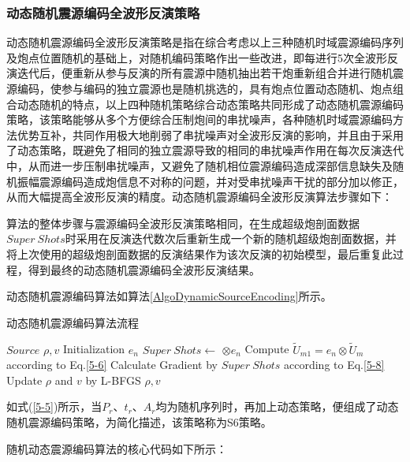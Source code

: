 \documentclass[12pt]{article}
\renewcommand{\algorithmicrequire}{\textbf{参数说明:}}
\renewcommand{\algorithmicensure}{\textbf{输出:}}
\newcommand{\upcite}[1]{\textsuperscript{\textsuperscript{\cite{#1}}}}
\begin{document}
\subsubsection{动态随机震源编码全波形反演策略}
动态随机震源编码全波形反演策略是指在综合考虑以上三种随机时域震源编码序列及炮点位置随机的基础上，对随机编码策略作出一些改进，即每进行5次全波形反演迭代后，便重新从参与反演的所有震源中随机抽出若干炮重新组合并进行随机震源编码，使参与编码的独立震源也是随机挑选的，具有炮点位置动态随机、炮点组合动态随机的特点\upcite{Lianghuang2017}，以上四种随机策略综合动态策略共同形成了动态随机震源编码策略，该策略能够从多个方便综合压制炮间的串扰噪声，各种随机时域震源编码方法优势互补，共同作用极大地削弱了串扰噪声对全波形反演的影响，并且由于采用了动态策略，既避免了相同的独立震源导致的相同的串扰噪声作用在每次反演迭代中\upcite{Lianghuang2017}，从而进一步压制串扰噪声，又避免了随机相位震源编码造成深部信息缺失及随机振幅震源编码造成炮信息不对称的问题，并对受串扰噪声干扰的部分加以修正，从而大幅提高全波形反演的精度。动态随机震源编码全波形反演算法步骤如下：
\par
算法的整体步骤与震源编码全波形反演策略相同，在生成超级炮剖面数据$Super\ Shots$时采用在反演迭代数次后重新生成一个新的随机超级炮剖面数据，并将上次使用的超级炮剖面数据的反演结果作为该次反演的初始模型，最后重复此过程，得到最终的动态随机震源编码全波形反演结果。
\par
动态随机震源编码算法如算法\ref{AlgoDynamicSourceEncoding}所示。
\begin{algorithm}[H]
\caption{动态随机震源编码算法流程}
\label{AlgoDynamicSourceEncoding}
\renewcommand{\algorithmicrequire}{\textbf{输入:}}
\renewcommand{\algorithmicensure}{\textbf{输出:}}
\begin{algorithmic}[1]
\Require
$Source$
\Ensure
$\rho,v$
\State Initialization $e_n$
$Super\ Shots \gets$ $\otimes e_n$ 
\State Compute $\tilde{U}_{m1}=e_n \otimes \tilde{U}_m$ according to Eq.\ref{5-6}
\State Calculate Gradient by $Super\ Shots$ according to Eq.\ref{5-8}
\State Update $\rho$ and $v$ by L-BFGS 
\EndFor
\EndFor
\State \Return $\rho,v$
\end{algorithmic}
\end{algorithm}
\par
如式(\ref{5-5})所示，当$P_r$、$t_r$、$A_r$均为随机序列时，再加上动态策略，便组成了动态随机震源编码策略，为简化描述，该策略称为S6策略。
\par
随机动态震源编码算法的核心代码如下所示：
\end{document}
